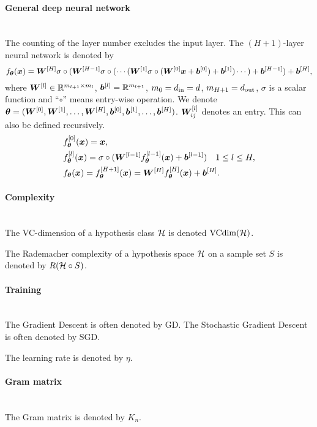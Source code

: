 \documentclass[]{article}
\begin{document}
\paragraph{General deep neural network}~\\
The counting of the layer number excludes the input layer. The $(H+1)$-layer neural network is denoted by
\begin{equation}
    f_{\bm{\theta}}(\bm{x}) = \bm{W}^{[H]} \sigma\circ(\bm{W}^{[H-1]}\sigma\circ(\cdots (\bm{W}^{[1]} \sigma\circ(\bm{W}^{[0]} \bm{x} + \bm{b}^{[0]} ) + \bm{b}^{[1]} )\cdots)+\bm{b}^{[H-1]})+\bm{b}^{[H]},
\end{equation}
where $\bm{W}^{[l]} \in \mathbb{R}^{m_{l+1}\times m_{l}}$, $\bm{b}^{[l]}=\mathbb{R}^{m_{l+1}}$, $m_0=d_{\rm in}=d$, $m_{H+1}=d_{\rm out}$,
$\sigma$ is a scalar function and ``$\circ$'' means entry-wise operation. 
We denote $\bm{\theta}=(\bm{W}^{[0]},\bm{W}^{[1]},\ldots,\bm{W}^{[H]},\bm{b}^{[0]},\bm{b}^{[1]},\ldots,\bm{b}^{[H]})$. $\bm{W}^{[l]}_{ij}$ denotes an entry. This can also be defined recursively.
\begin{align}
    &f_{\bm{\theta}}^{[0]}(\bm{x})=\bm{x}, \\
    &f_{\bm{\theta}}^{[l]}(\bm{x})=\sigma\circ(\bm{W}^{[l-1]} f_{\bm{\theta}}^{[l-1]}(\bm{x}) + \bm{b}^{[l-1]}) \quad 1\leq l\leq H,\\
    &f_{\bm{\theta}}(\bm{x})=f_{\bm{\theta}}^{[H+1]}(\bm{x})=\bm{W}^{[H]} f_{\bm{\theta}}^{[H]}(\bm{x}) + \bm{b}^{[H]}.
\end{align}

\paragraph{Complexity}~\\
The VC-dimension of a hypothesis class $\mathcal{H}$ is denoted ${\rm VCdim}(\mathcal{H})$.

The Rademacher complexity of a hypothesis space $\mathcal{H}$ on a sample set $S$ is denoted by $R (\mathcal{H}\circ S)$.

\paragraph{Training}~\\
The Gradient Descent is often denoted by GD. The Stochastic Gradient Descent is often denoted by SGD. 

The learning rate is denoted by $\eta$.

\paragraph{Gram matrix}~\\
The Gram matrix is denoted by $K_n$.
\end{document}
